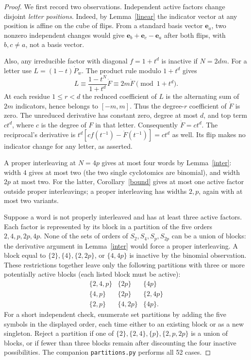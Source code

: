 \documentclass[11pt]{article}
\begin{document}
\begin{proof}
We first record two observations. Independent active factors change disjoint \emph{letter positions}. Indeed, by Lemma~\ref{linear} the indicator vector at any position is affine on the cube of flips. From a standard basis vector \(\mathbf e_a\), two nonzero independent changes would give
\(\mathbf e_b+\mathbf e_c-\mathbf e_a\) after both flips, with \(b,c\ne a\), not a basis vector.

Also, any irreducible factor with diagonal \(f=1+t^d\) is inactive if \(N=2dm\). For a letter use \(L=(1-t)\dot P_w\). The product rule modulo \(1+t^d\) gives
\[
 L\equiv \frac{1-t^N}{1+t^d}\dot F\equiv 2m\dot F\pmod {1+t^d}.
\]
At each residue \(1\le r<d\) the reduced coefficient of \(L\) is the alternating sum of \(2m\) indicators, hence belongs to \([-m,m]\). Thus the degree-\(r\) coefficient of \(\dot F\) is zero. The unreduced derivative has constant zero, degree at most \(d\), and top term \(c t^d\), where \(c\) is the degree of \(F\) in that letter. Consequently \(\dot F=ct^d\). The reciprocal's derivative is \(t^d[c f(t^{-1})-\dot F(t^{-1})]=ct^d\) as well. Its flip makes no indicator change for any letter, as asserted.

A proper interleaving at \(N=4p\) gives at most four words by Lemma~\ref{inter}: width \(4\) gives at most two (the two single cyclotomics are binomial), and width \(2p\) at most two. For the latter, Corollary~\ref{bound} gives at most one active factor outside proper interleavings; a proper interleaving has widths \(2,p\), again with at most two variants.

Suppose a word is not properly interleaved and has at least three active factors. Each factor is represented by its block in a partition of the five orders \(2,4,p,2p,4p\). None of the sets of orders of \(S_2,S_4,S_p,S_{2p}\) can be a union of blocks: the derivative argument in Lemma~\ref{inter} would force a proper interleaving. A block equal to \(\{2\},\{4\},\{2,2p\}\), or \(\{4,4p\}\) is inactive by the binomial observation. These restrictions together leave only the following partitions with three or more potentially active blocks (each listed block must be active):
\[
\begin{array}{ccc}
 \{2,4,p\}&\{2p\}&\{4p\}\\
 \{4,p\}&\{2p\}&\{2,4p\}\\
 \{2,p\}&\{4,2p\}&\{4p\}.
\end{array}
\]
For a short independent check, enumerate set partitions by adding the five symbols in the displayed order, each time either to an existing block or as a new singleton. Reject a partition if one of \(\{2\},\{2,4\},\{p\},\{2,p,2p\}\) is a union of blocks, or if fewer than three blocks remain after discounting the four inactive possibilities. The companion \texttt{partitions.py} performs all 52 cases.


\end{proof}
\end{document}
